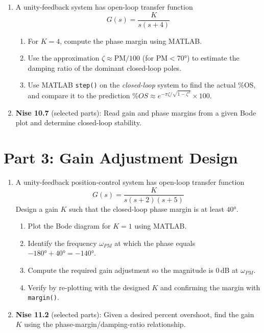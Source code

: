\documentclass[11pt]{article}
\begin{document}
\begin{enumerate}[resume]

\item A unity-feedback system has open-loop transfer function
  \[
    G(s) = \frac{K}{s(s+4)}
  \]
  \begin{enumerate}
    \item For $K = 4$, compute the phase margin using MATLAB.
    \item Use the approximation $\zeta \approx \mathrm{PM}/100$ (for
      $\mathrm{PM} < 70°$) to estimate the damping ratio of the dominant
      closed-loop poles.
    \item Use MATLAB \texttt{step()} on the \emph{closed-loop} system to find
      the actual \%OS, and compare it to the prediction
      $\%OS \approx e^{-\pi\zeta/\sqrt{1-\zeta^2}} \times 100$.
  \end{enumerate}

\item \textbf{Nise 10.7} (selected parts): Read gain and phase margins from a
  given Bode plot and determine closed-loop stability.

\end{enumerate}

\section*{Part 3: Gain Adjustment Design}

\begin{enumerate}[resume]

\item A unity-feedback position-control system has open-loop transfer function
  \[
    G(s) = \frac{K}{s(s+2)(s+5)}
  \]
  Design a gain $K$ such that the closed-loop phase margin is at least $40°$.

  \begin{enumerate}
    \item Plot the Bode diagram for $K = 1$ using MATLAB.
    \item Identify the frequency $\omega_{PM}$ at which the phase equals
      $-180° + 40° = -140°$.
    \item Compute the required gain adjustment so the magnitude is $0$\,dB at
      $\omega_{PM}$.
    \item Verify by re-plotting with the designed $K$ and confirming the margin
      with \texttt{margin()}.
  \end{enumerate}

\item \textbf{Nise 11.2} (selected parts): Given a desired percent overshoot,
  find the gain $K$ using the phase-margin/damping-ratio relationship.

\end{enumerate}
\end{document}
